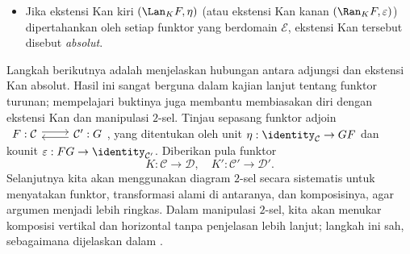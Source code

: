 \begin{definisi}
\begin{itemize}
\[\begin{tikzcd}[column sep=large]
			\mathcal{D} \arrow[r, "{\Lan_K F}"'] \arrow[Rightarrow, from=F, "\eta" description] & \mathcal{E} \arrow[r, "M"'] & \mathcal{F}
		\end{tikzcd} =: \begin{tikzcd}
			\mathcal{C} \arrow[rr, "MF", ""{name=MF}] \arrow[rd, "K"'] & & \mathcal{F}  \\
			& \mathcal{D} \arrow[ru, "{M \Lan_K F}"'] \arrow[Rightarrow, from=MF, "M\eta" description] &
		\end{tikzcd}\]
		memberikan ekstensi Kan kiri dari $MF$ di sepanjang $K$.
		\item Jika ekstensi Kan kiri $(\Lan_K F, \eta)$ (atau ekstensi Kan kanan
		$(\Ran_K F, \varepsilon)$) dipertahankan oleh setiap funktor yang
		berdomain $\mathcal{E}$, ekstensi Kan tersebut disebut
		\emph{absolut}.
	\end{itemize}
\end{definisi}

Langkah berikutnya adalah menjelaskan hubungan antara adjungsi dan ekstensi Kan
absolut. Hasil ini sangat berguna dalam kajian lanjut tentang funktor turunan;
mempelajari buktinya juga membantu membiasakan diri dengan ekstensi Kan dan
manipulasi $2$-sel. Tinjau sepasang funktor adjoin
$\begin{tikzcd}
	F: \mathcal{C} \arrow[r, shift left] & \mathcal{C}' \arrow[l, shift left] : G
\end{tikzcd}$,
yang ditentukan oleh unit $\eta: \identity_{\mathcal{C}} \to GF$ dan kounit
$\varepsilon: FG \to \identity_{\mathcal{C}'}$. Diberikan pula funktor
\[ K: \mathcal{C} \to \mathcal{D}, \quad K': \mathcal{C}' \to \mathcal{D}'. \]
Selanjutnya kita akan menggunakan diagram $2$-sel secara sistematis untuk
menyatakan funktor, transformasi alami di antaranya, dan komposisinya, agar
argumen menjadi lebih ringkas. Dalam manipulasi $2$-sel, kita akan menukar
komposisi vertikal dan horizontal tanpa penjelasan lebih lanjut; langkah ini
sah, sebagaimana dijelaskan dalam \cite[Lema 2.2.7]{Li1}.

